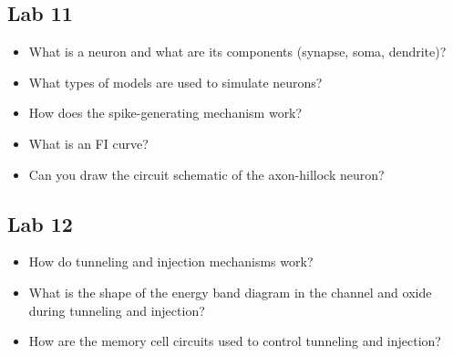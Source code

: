 \documentclass[main]{subfiles}
\begin{document}
\subsection{Lab 11}
\begin{itemize}
\item What is a neuron and what are its components (synapse, soma, dendrite)? \item What types of
models are used to simulate neurons? \item How does the spike-generating mechanism work?
\item What is an FI curve? \item Can you draw the circuit schematic of the axon-hillock neuron?
\end{itemize}


\subsection{Lab 12}
\begin{itemize}
\item How do tunneling and injection mechanisms work? \item What is the shape of the energy band
diagram in the channel and oxide during tunneling and injection? \item How are the memory cell
circuits used to control tunneling and injection?
\end{itemize}
\end{document}
